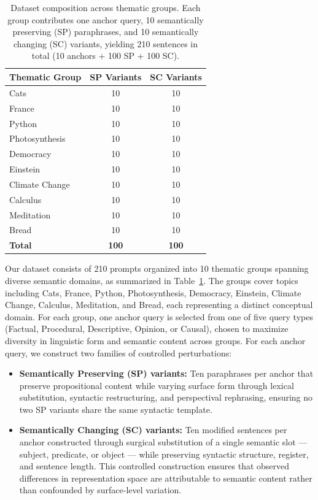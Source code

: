 \begin{table}[h]
\centering
\vspace{4pt}
\begin{tabular}{lcc}
\toprule
\textbf{Thematic Group} & \textbf{SP Variants} & \textbf{SC Variants} \\
\midrule
Cats           & 10 & 10 \\
France         & 10 & 10 \\
Python         & 10 & 10 \\
Photosynthesis & 10 & 10 \\
Democracy      & 10 & 10 \\
Einstein       & 10 & 10 \\
Climate Change & 10 & 10 \\
Calculus       & 10 & 10 \\
Meditation     & 10 & 10 \\
Bread          & 10 & 10 \\
\midrule
\textbf{Total} & \textbf{100} & \textbf{100} \\
\bottomrule
\end{tabular}
\caption{Dataset composition across thematic groups. Each group contributes one anchor query, 10 semantically preserving (SP) paraphrases, and 10 semantically changing (SC) variants, yielding 210 sentences in total (10 anchors + 100 SP + 100 SC).}
\label{tab:dataset_category}
\vspace{-2.0em}
\end{table}

Our dataset consists of 210 prompts organized into 10 thematic groups spanning diverse semantic domains, as summarized in Table~\ref{tab:dataset_category}. The groups cover topics including Cats, France, Python, Photosynthesis, Democracy, Einstein, Climate Change, Calculus, Meditation, and Bread, each representing a distinct conceptual domain. For each group, one anchor query is selected from one of five query types (Factual, Procedural, Descriptive, Opinion, or Causal), chosen to maximize diversity in linguistic form and semantic content across groups. For each anchor query, we construct two families of controlled perturbations:

\begin{itemize}
    \item \textbf{Semantically Preserving (SP) variants:} Ten paraphrases per anchor that preserve propositional content while varying surface form through lexical substitution, syntactic restructuring, and perspectival rephrasing, ensuring no two SP variants share the same syntactic template.
    \item \textbf{Semantically Changing (SC) variants:} Ten modified sentences per anchor constructed through surgical substitution of a single semantic slot — subject, predicate, or object — while preserving syntactic structure, register, and sentence length. This controlled construction ensures that observed differences in representation space are attributable to semantic content rather than confounded by surface-level variation.
\end{itemize}

